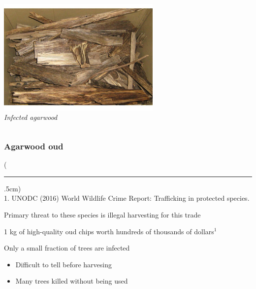 \documentclass[10pt]{beamer}
\newenvironment{reference}[2]{%
	\begin{textblock*}{\textwidth}(#1,#2)
		\tiny\bgroup\color{gray}}{\egroup\end{textblock*}}
\begin{document}
\begin{frame}[t]
\begin{columns}
		\begin{column}{0.5\textwidth}
			\begin{center}
				\includegraphics[width=0.6\textwidth]{figures/agarwood3.jpg}\\
				\emph{Infected agarwood}
			\end{center}
		\end{column}
	\end{columns}
\end{frame}


\begin{frame}[t]
\frametitle{Agarwood oud}
\vspace{0.5cm}

	\begin{reference}{4mm}{92mm}
		\rule{1.5cm}{0.25pt}\\
		1. UNODC (2016) World Wildlife Crime Report: Trafficking in protected species.
	\end{reference}

	Primary threat to these species is illegal harvesting for this trade\\
	
	\vspace{0.5cm}
	
	1 kg of high-quality oud chips worth hundreds of thousands of dollars$^{1}$\\
	
	\vspace{0.5cm}

	Only a small fraction of trees are infected
	\smallskip
		\begin{itemize}
			\item Difficult to tell before harvesing
			\smallskip
			\item Many trees killed without being used
		\end{itemize}
\end{frame}
\end{document}
